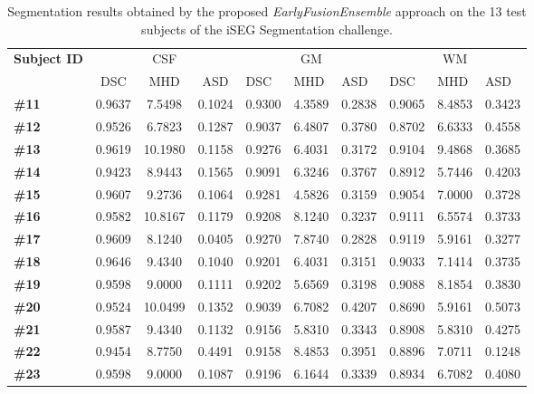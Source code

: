 \documentclass[twoside,espcrc2]{elsarticle}
\begin{document}
\begin{table}[ht!]
\centering
\caption{Segmentation results obtained by the proposed \textit{EarlyFusionEnsemble} approach on the 13 test subjects of the iSEG Segmentation challenge.}
\label{table:resultsSingle}
\begin{small}
\begin{tabular}{lccccccccc}
\toprule
\multirow{2}[3]{*}{\textbf{Subject ID}} & \multicolumn{3}{c}{{CSF}} & \multicolumn{3}{c}{{GM}} & \multicolumn{3}{c}{{WM}} \\
\cmidrule(lr){2-4}\cmidrule(lr){5-7}\cmidrule(lr){8-10}
& {DSC} & {MHD} & {ASD} & \multicolumn{1}{l}{{DSC}} & \multicolumn{1}{l}{{MHD}} & \multicolumn{1}{l}{{ASD}} & \multicolumn{1}{l}{{DSC}} & \multicolumn{1}{l}{{MHD}} & \multicolumn{1}{l}{{ASD}} \\
\midrule\midrule
\textbf{\#11} & 0.9637 & 7.5498 & 0.1024 & 0.9300 & 4.3589 & 0.2838 &  0.9065 & 8.4853 & 0.3423 \\
\textbf{\#12} & 0.9526 & 6.7823 & 0.1287 & 0.9037 & 6.4807 & 0.3780 & 0.8702 & 6.6333  &  0.4558 \\
\textbf{\#13} & 0.9619 & 10.1980 & 0.1158 & 0.9276 & 6.4031 & 0.3172 & 0.9104 & 9.4868 & 0.3685 \\ 
\textbf{\#14} & 0.9423 & 8.9443  & 0.1565 & 0.9091 & 6.3246  & 0.3767 &  0.8912 & 5.7446 &  0.4203 \\
\textbf{\#15} & 0.9607 & 9.2736  & 0.1064 & 0.9281 & 4.5826 & 0.3159 & 0.9054 & 7.0000 & 0.3728 \\
\textbf{\#16} & 0.9582 & 10.8167 & 0.1179 & 0.9208 & 8.1240  & 0.3237 & 0.9111  & 6.5574 & 0.3733 \\
\textbf{\#17} & 0.9609 & 8.1240 & 0.0405 & 0.9270 & 7.8740 & 0.2828 & 0.9119 & 5.9161 & 0.3277 \\
\textbf{\#18} & 0.9646 & 9.4340 & 0.1040 & 0.9201 & 6.4031 & 0.3151 & 0.9033 & 7.1414 & 0.3735 \\
\textbf{\#19} & 0.9598 & 9.0000 & 0.1111 & 0.9202 & 5.6569 & 0.3198  & 0.9088 & 8.1854 & 0.3830 \\
\textbf{\#20} & 0.9524 & 10.0499 & 0.1352 & 0.9039 & 6.7082 & 0.4207 & 0.8690 & 5.9161 & 0.5073 \\
\textbf{\#21} & 0.9587 & 9.4340 & 0.1132 & 0.9156  & 5.8310 & 0.3343 &  0.8908 & 5.8310 & 0.4275 \\
\textbf{\#22} & 0.9454 & 8.7750 & 0.4491 & 0.9158 & 8.4853 & 0.3951 & 0.8896 & 7.0711 & 0.1248 \\
\textbf{\#23} & 0.9598 & 9.0000 & 0.1087 & 0.9196  & 6.1644 & 0.3339  & 0.8934 & 6.7082 & 0.4080 \\
\bottomrule
\end{tabular}
\end{small}
\end{table}
\end{document}
